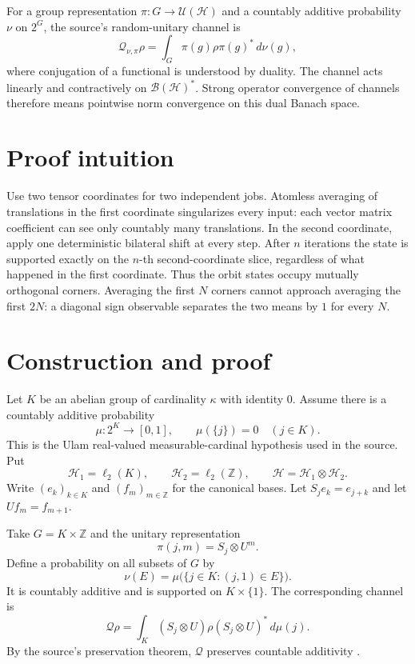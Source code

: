 \documentclass[11pt]{article}
\newcommand{\B}{\mathcal B}
\newcommand{\Q}{\mathcal Q}
\begin{document}
For a group representation $\pi:G\to\mathcal U(\mathcal H)$ and a
countably additive probability $\nu$ on $2^G$, the source's random-unitary
channel is
\[
 \Q_{\nu,\pi}\rho=\int_G \pi(g)\rho\pi(g)^*\,d\nu(g),
\]
where conjugation of a functional is understood by duality. The channel acts
linearly and contractively on $\B(\mathcal H)^*$. Strong operator convergence
of channels therefore means pointwise norm convergence on this dual Banach
space.

\section{Proof intuition}

Use two tensor coordinates for two independent jobs. Atomless averaging of
translations in the first coordinate singularizes every input: each vector
matrix coefficient can see only countably many translations. In the second
coordinate, apply one deterministic bilateral shift at every step. After $n$
iterations the state is supported exactly on the $n$-th second-coordinate
slice, regardless of what happened in the first coordinate. Thus the orbit
states occupy mutually orthogonal corners. Averaging the first $N$ corners
cannot approach averaging the first $2N$: a diagonal sign observable separates
the two means by $1$ for every $N$.

\section{Construction and proof}

Let $K$ be an abelian group of cardinality $\kappa$ with identity $0$.
Assume there is a countably additive probability
\[
 \mu:2^K\longrightarrow[0,1],\qquad \mu(\{j\})=0\quad(j\in K).
\]
This is the Ulam real-valued measurable-cardinal hypothesis used in the
source. Put
\[
 \mathcal H_1=\ell_2(K),\qquad \mathcal H_2=\ell_2(\mathbb Z),\qquad
 \mathcal H=\mathcal H_1\otimes\mathcal H_2.
\]
Write $(e_k)_{k\in K}$ and $(f_m)_{m\in\mathbb Z}$ for the canonical bases.
Let $S_j e_k=e_{j+k}$ and let $Uf_m=f_{m+1}$.

Take $G=K\times\mathbb Z$ and the unitary representation
\[
 \pi(j,m)=S_j\otimes U^m.
\]
Define a probability on all subsets of $G$ by
\[
 \nu(E)=\mu\bigl(\{j\in K:(j,1)\in E\}\bigr).
\]
It is countably additive and is supported on $K\times\{1\}$. The corresponding
channel is
\begin{equation}\label{eq:channel}
 \Q\rho=\int_K (S_j\otimes U)\rho(S_j\otimes U)^*\,d\mu(j).
\end{equation}
By the source's preservation theorem, $\Q$ preserves countable additivity
\cite{Dzhenzher}.
\end{document}

